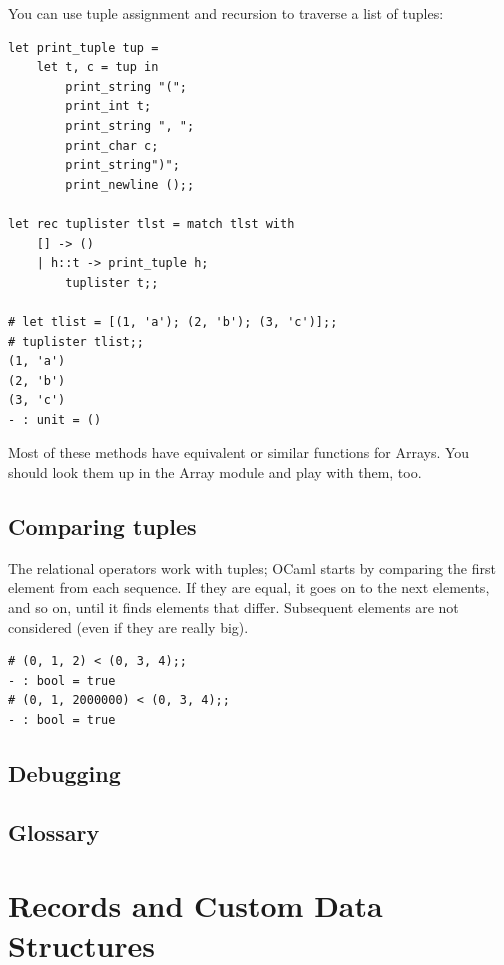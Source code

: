 \documentclass[10pt]{book}
\begin{document}
{

You can use tuple assignment and recursion to traverse a list of
tuples:


\beforeverb
\begin{verbatim}
let print_tuple tup = 
	let t, c = tup in
		print_string "(";
		print_int t;
		print_string ", ";
		print_char c;
		print_string")";
		print_newline ();;

let rec tuplister tlst = match tlst with 
	[] -> ()
	| h::t -> print_tuple h;
		tuplister t;;

# let tlist = [(1, 'a'); (2, 'b'); (3, 'c')];;
# tuplister tlist;;
(1, 'a')
(2, 'b')
(3, 'c')
- : unit = () 
\end{verbatim}
\afterverb

\begin{ex}
Most of these methods have equivalent or similar functions for Arrays. You should look them up in the Array module and play with them, too.
\end{ex}

\section{Comparing tuples}


The relational operators work with tuples;
OCaml starts by comparing the first element from each
sequence.  If they are equal, it goes on to the next elements,
and so on, until it finds elements that differ.  Subsequent
elements are not considered (even if they are really big).

\beforeverb
\begin{verbatim}
# (0, 1, 2) < (0, 3, 4);;
- : bool = true
# (0, 1, 2000000) < (0, 3, 4);;
- : bool = true
\end{verbatim}
\afterverb

\section{Debugging}

\section{Glossary}

\chapter{Records and Custom Data Structures}

}
\end{document}
